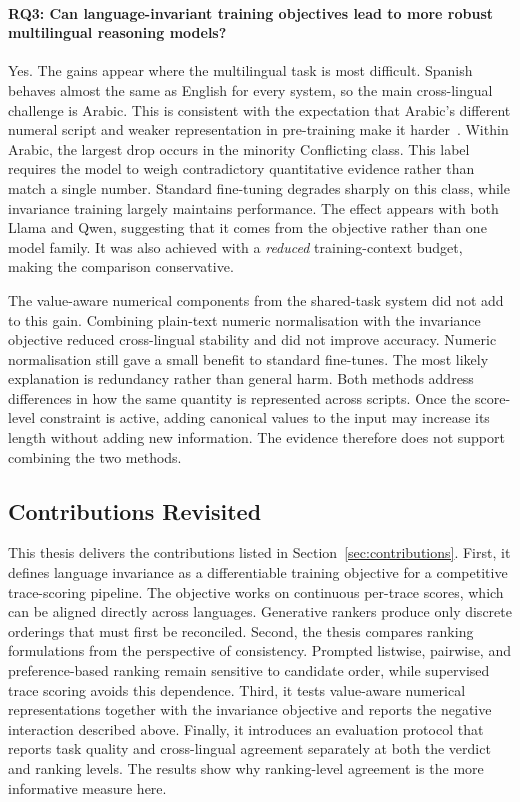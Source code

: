\paragraph{RQ3: Can language-invariant training objectives lead to more robust multilingual reasoning
models?} Yes. The gains appear where the multilingual task is most difficult. Spanish behaves almost
the same as English for every system, so the main cross-lingual challenge is Arabic. This is consistent
with the expectation that Arabic's different numeral script and weaker representation in pre-training
make it harder~\cite{reddy2026effectscriptsformatsllm}. Within Arabic, the largest drop occurs in the
minority \textsf{Conflicting} class. This label requires the model to weigh contradictory quantitative
evidence rather than match a single number. Standard fine-tuning degrades sharply on this class, while
invariance training largely maintains performance. The effect appears with both Llama and Qwen,
suggesting that it comes from the objective rather than one model family. It was also achieved with a
\emph{reduced} training-context budget, making the comparison conservative.

The value-aware numerical components from the shared-task system did not add to this gain. Combining
plain-text numeric normalisation with the invariance objective reduced cross-lingual stability and did
not improve accuracy. Numeric normalisation still gave a small benefit to standard fine-tunes. The
most likely explanation is redundancy rather than general harm. Both methods address differences in
how the same quantity is represented across scripts. Once the score-level constraint is active,
adding canonical values to the input may increase its length without adding new information. The
evidence therefore does not support combining the two methods.

\subsection{Contributions Revisited}
\label{subsec:concl-contrib}

This thesis delivers the contributions listed in Section~\ref{sec:contributions}. First, it defines
language invariance as a differentiable training objective for a competitive trace-scoring pipeline.
The objective works on continuous per-trace scores, which can be aligned directly across languages.
Generative rankers produce only discrete orderings that must first be reconciled. Second, the thesis
compares ranking formulations from the perspective of consistency. Prompted listwise, pairwise, and
preference-based ranking remain sensitive to candidate order, while supervised trace scoring avoids
this dependence. Third, it tests value-aware numerical representations together with the invariance
objective and reports the negative interaction described above. Finally, it introduces an evaluation
protocol that reports task quality and cross-lingual agreement separately at both the verdict and
ranking levels. The results show why ranking-level agreement is the more informative measure here.

